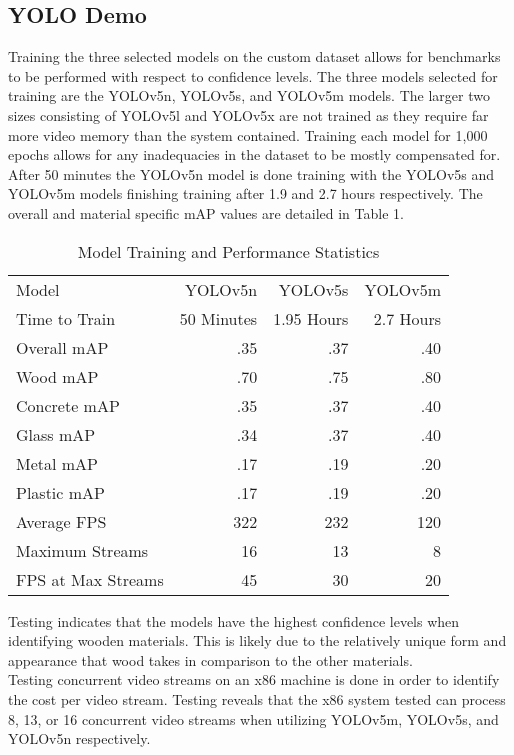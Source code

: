 \documentclass[conference]{IEEEtran}
\begin{document}
\subsection{YOLO Demo}
Training the three selected models on the custom dataset allows for benchmarks to be performed with respect to confidence levels. The three models selected for training are the YOLOv5n, YOLOv5s, and YOLOv5m models. The larger two sizes consisting of YOLOv5l and YOLOv5x are not trained as they require far more video memory than the system contained. Training each model for 1,000 epochs allows for any inadequacies in the dataset to be mostly compensated for. After 50 minutes the YOLOv5n model is done training with the YOLOv5s and YOLOv5m models finishing training after 1.9 and 2.7 hours respectively. The overall and material specific mAP values are detailed in Table 1.\\
\begin{table}
        \centering
        \begin{tabular}{lrrr}
            Model & YOLOv5n & YOLOv5s & YOLOv5m\\
            Time to Train & 50 Minutes & 1.95 Hours & 2.7 Hours\\
            Overall mAP & .35 & .37 & .40\\
            Wood mAP & .70 & .75 & .80\\
            Concrete mAP & .35 & .37 & .40\\
            Glass mAP & .34 & .37 & .40\\
            Metal mAP & .17 & .19 & .20\\
            Plastic mAP & .17 & .19 & .20\\
            Average FPS & 322 & 232 & 120\\
            Maximum Streams & 16 & 13 & 8\\
            FPS at Max Streams & 45 & 30 & 20\\
        \end{tabular}
        \caption{Model Training and Performance Statistics}
        \label{tab:Performance}
    \end{table}
Testing indicates that the models have the highest confidence levels when identifying wooden materials. This is likely due to the relatively unique form and appearance that wood takes in comparison to the other materials.\\
Testing concurrent video streams on an x86 machine is done in order to identify the cost per video stream. Testing reveals that the x86 system tested can process 8, 13, or 16 concurrent video streams when utilizing YOLOv5m, YOLOv5s, and YOLOv5n respectively. 
\end{document}
